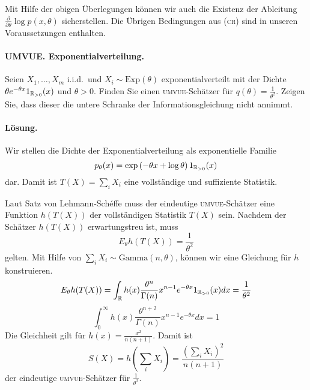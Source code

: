 Mit Hilfe der obigen Überlegungen können wir auch die Existenz der Ableitung 
$\frac{\partial}{\partial \theta} \log p(x,\theta)$ sicherstellen.
Die Übrigen Bedingungen aus (\textsc{cr}) sind in unseren Voraussetzungen enthalten.






\paragraph{UMVUE. Exponentialverteilung.   }
Seien $X_1,\ldots,X_m$ i.i.d.\ und $X_i\sim \textrm{Exp}(\theta)$ exponentialverteilt
mit der Dichte $\theta e^{-\theta x}1_{\mathbb R_{>0}}(x)$ und $\theta>0$.
Finden Sie einen \textsc{umvue}-Schätzer für $q(\theta) = \frac{1}{\theta^2}$. Zeigen Sie, dass
dieser die untere Schranke der Informationsgleichung nicht annimmt.

\paragraph*{Lösung.} Wir stellen die Dichte der Exponentialverteilung als exponentielle
Familie 
\begin{equation}
    p_\theta(x) = \exp \left( -\theta x + \log \theta \right) 1_{\mathbb R_{>0}}(x)
\end{equation}
dar. Damit ist $T(X)=\sum_{i}^{} X_i$ eine vollständige und suffiziente Statistik.

Laut Satz von Lehmann-Sch\'effe muss der eindeutige \textsc{umvue}-Schätzer eine Funktion $h(T(X))$
der vollständigen Statistik $T(X)$ sein. Nachdem der Schätzer $h(T(X))$ erwartungstreu
ist, muss
\begin{equation}
    E_\theta h(T(X)) = \frac{1}{\theta^2}
\end{equation}
gelten. Mit Hilfe von $\sum_{i}^{} X_i \sim \textrm{Gamma}(n,\theta)$, können wir eine 
Gleichung für $h$ konstruieren.
\begin{equation}
    E_\theta h(T(X)) =  \int_{\mathbb R} h(x) \frac{\theta^n}{\Gamma(n)} x^{n-1}e^{-\theta x} 1_{\mathbb R_{>0}}(x) dx =\frac{1}{\theta^2} 
\end{equation}
\begin{equation}
    \int_{0}^{\infty} h(x) \frac{\theta^{n+2}}{\Gamma(n)}  x^{n-1} e^{-\theta x} dx = 1
\end{equation}
Die Gleichheit gilt für $h(x)= \frac{x^2}{n(n+1)}$. Damit ist 
\begin{equation}
    S(X) = h\left( \sum_{i}^{} X_i \right) = \frac{\left( \sum_{i}^{} X_i \right)^2}{n(n+1)}
\end{equation}
der eindeutige \textsc{umvue}-Schätzer für $\frac{1}{\theta^2}$.

